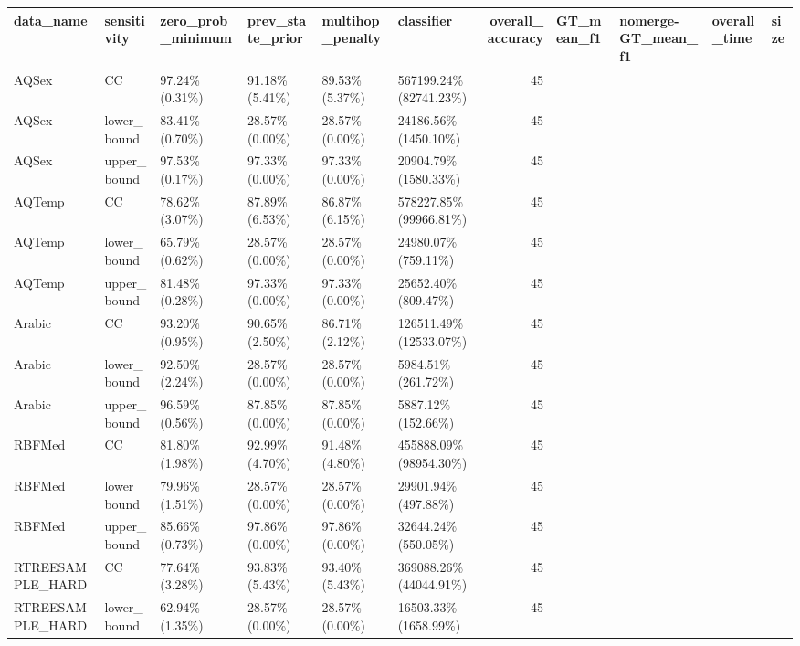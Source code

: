 \begin{tabular}{llllllr}
\toprule
       data\_name &  sensitivity &  zero\_prob\_minimum &  prev\_state\_prior &  multihop\_penalty &  classifier & overall\_accuracy &     GT\_mean\_f1 & nomerge-GT\_mean\_f1 &           overall\_time &  size \\
\midrule
           AQSex &          CC &   97.24\% (0.31\%) & 91.18\% (5.41\%) &     89.53\% (5.37\%) & 567199.24\% (82741.23\%) &    45 \\
           AQSex & lower\_bound &   83.41\% (0.70\%) & 28.57\% (0.00\%) &     28.57\% (0.00\%) &   24186.56\% (1450.10\%) &    45 \\
           AQSex & upper\_bound &   97.53\% (0.17\%) & 97.33\% (0.00\%) &     97.33\% (0.00\%) &   20904.79\% (1580.33\%) &    45 \\
          AQTemp &          CC &   78.62\% (3.07\%) & 87.89\% (6.53\%) &     86.87\% (6.15\%) & 578227.85\% (99966.81\%) &    45 \\
          AQTemp & lower\_bound &   65.79\% (0.62\%) & 28.57\% (0.00\%) &     28.57\% (0.00\%) &    24980.07\% (759.11\%) &    45 \\
          AQTemp & upper\_bound &   81.48\% (0.28\%) & 97.33\% (0.00\%) &     97.33\% (0.00\%) &    25652.40\% (809.47\%) &    45 \\
          Arabic &          CC &   93.20\% (0.95\%) & 90.65\% (2.50\%) &     86.71\% (2.12\%) & 126511.49\% (12533.07\%) &    45 \\
          Arabic & lower\_bound &   92.50\% (2.24\%) & 28.57\% (0.00\%) &     28.57\% (0.00\%) &     5984.51\% (261.72\%) &    45 \\
          Arabic & upper\_bound &   96.59\% (0.56\%) & 87.85\% (0.00\%) &     87.85\% (0.00\%) &     5887.12\% (152.66\%) &    45 \\
          RBFMed &          CC &   81.80\% (1.98\%) & 92.99\% (4.70\%) &     91.48\% (4.80\%) & 455888.09\% (98954.30\%) &    45 \\
          RBFMed & lower\_bound &   79.96\% (1.51\%) & 28.57\% (0.00\%) &     28.57\% (0.00\%) &    29901.94\% (497.88\%) &    45 \\
          RBFMed & upper\_bound &   85.66\% (0.73\%) & 97.86\% (0.00\%) &     97.86\% (0.00\%) &    32644.24\% (550.05\%) &    45 \\
RTREESAMPLE\_HARD &          CC &   77.64\% (3.28\%) & 93.83\% (5.43\%) &     93.40\% (5.43\%) & 369088.26\% (44044.91\%) &    45 \\
RTREESAMPLE\_HARD & lower\_bound &   62.94\% (1.35\%) & 28.57\% (0.00\%) &     28.57\% (0.00\%) &   16503.33\% (1658.99\%) &    45 \\

\end{tabular}
